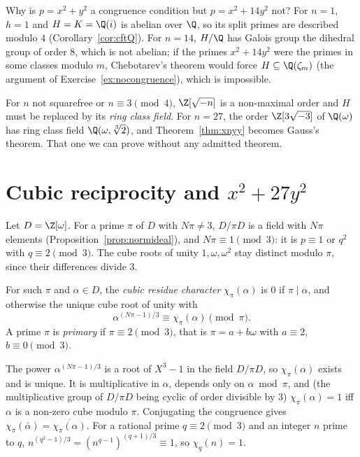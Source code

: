 \begin{think}
Why is $p=x^2+y^2$ a congruence condition but $p=x^2+14y^2$ not? For $n=1$, $h=1$ and $H=K=\Q(i)$ is abelian over $\Q$, so its split primes are
described modulo $4$ (Corollary~\ref{cor:cftQ}). For $n=14$, $H/\Q$ has Galois group the dihedral group of order $8$, which is not abelian; if the
primes $x^2+14y^2$ were the primes in some classes modulo $m$, Chebotarev's theorem would force $H\subseteq\Q(\zeta_m)$ (the argument of
Exercise~\ref{ex:nocongruence}), which is impossible.
\end{think}

For $n$ not squarefree or $n\equiv3\pmod4$, $\Z[\sqrt{-n}]$ is a non-maximal order and $H$ must be replaced by its \emph{ring class field}. For
$n=27$, the order $\Z[3\sqrt{-3}]$ of $\Q(\omega)$ has ring class field $\Q(\omega,\sqrt[3]2)$, and Theorem~\ref{thm:xnyy} becomes Gauss's theorem.
That one we can prove without any admitted theorem.

\section{Cubic reciprocity and \texorpdfstring{$x^2+27y^2$}{x²+27y²}}

Let $D=\Z[\omega]$. For a prime $\pi$ of $D$ with $N\pi\ne3$, $D/\pi D$ is a field with $N\pi$ elements (Proposition~\ref{prop:normideal}), and $N\pi\equiv1
\pmod3$: it is $p\equiv1$ or $q^2$ with $q\equiv2\pmod3$. The cube roots of unity $1,\omega,\omega^2$ stay distinct modulo $\pi$, since their
differences divide $3$.

\begin{definition}
For such $\pi$ and $\alpha\in D$, the \emph{cubic residue character} $\chi_\pi(\alpha)$ is $0$ if $\pi\mid\alpha$, and otherwise the unique cube root of
unity with
\[
\alpha^{(N\pi-1)/3}\equiv\chi_\pi(\alpha)\pmod\pi.
\]
A prime $\pi$ is \emph{primary} if $\pi\equiv2\pmod3$, that is $\pi=a+b\omega$ with $a\equiv2$, $b\equiv0\pmod3$.
\end{definition}

The power $\alpha^{(N\pi-1)/3}$ is a root of $X^3-1$ in the field $D/\pi D$, so $\chi_\pi(\alpha)$ exists and is unique. It is multiplicative in $\alpha$,
depends only on $\alpha\bmod\pi$, and (the multiplicative group of $D/\pi D$ being cyclic of order divisible by $3$) $\chi_\pi(\alpha)=1$ iff $\alpha$ is a
non-zero cube modulo $\pi$. Conjugating the congruence gives $\chi_{\bar\pi}(\bar\alpha)=\overline{\chi_\pi(\alpha)}$. For a rational prime $q\equiv2\pmod3$
and an integer $n$ prime to $q$, $n^{(q^2-1)/3}=(n^{q-1})^{(q+1)/3}\equiv1$, so $\chi_q(n)=1$.

